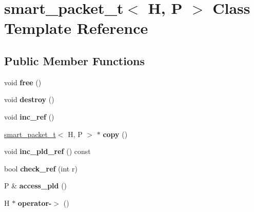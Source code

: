 \hypertarget{classsmart__packet__t}{}\section{smart\+\_\+packet\+\_\+t$<$ H, P $>$ Class Template Reference}
\label{classsmart__packet__t}
\subsection*{Public Member Functions}
\begin{DoxyCompactItemize}
\item 
\mbox{\label{classsmart__packet__t_a80cac4bebb326ebe6088fa40b8c9806a}} 
void {\bfseries free} ()
\item 
\mbox{\label{classsmart__packet__t_a55aebd96de40a1082b1c3a9bf87d96e4}} 
void {\bfseries destroy} ()
\item 
\mbox{\label{classsmart__packet__t_a9cb48a1440ea141bdc596969ab11b333}} 
void {\bfseries inc\+\_\+ref} ()
\item 
\mbox{\label{classsmart__packet__t_a4c97202e0bef3f8f42b19ba05b73b644}} 
\hyperlink{classsmart__packet__t}{smart\+\_\+packet\+\_\+t}$<$ H, P $>$ $\ast$ {\bfseries copy} ()
\item 
\mbox{\label{classsmart__packet__t_a73f031a606e328a996bc6529e37d5489}} 
void {\bfseries inc\+\_\+pld\+\_\+ref} () const
\item 
\mbox{\label{classsmart__packet__t_a44ec52e5f9df75ae58f93c612eb3decd}} 
bool {\bfseries check\+\_\+ref} (int r)
\item 
\mbox{\label{classsmart__packet__t_a0b068d524c3d280577b37bbe8a5fa04d}} 
P \& {\bfseries access\+\_\+pld} ()
\item 
\mbox{\label{classsmart__packet__t_a68f933f0fa798d37268d185f3ea25c8b}} 
H $\ast$ {\bfseries operator-\/$>$} ()
\item 
\mbox{\label{classsmart__packet__t_a2c423010887f8e870a55f462a79ca036}} 

\end{DoxyCompactItemize}
